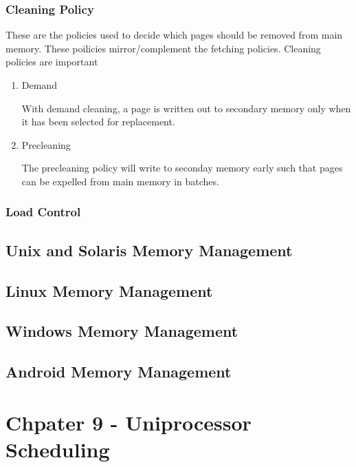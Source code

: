 \documentclass[11pt]{article}
\begin{document}
\subsubsection{Cleaning Policy}
\label{sec-2-2-5}

These are the policies used to decide which pages should be removed
from main memory. These poilicies mirror/complement the fetching
policies. Cleaning policies are important

\begin{enumerate}
\item Demand
\label{sec-2-2-5-1}

With demand cleaning, a page is written out to secondary memory
only when it has been selected for replacement.

\item Precleaning
\label{sec-2-2-5-2}

The precleaning policy will write to seconday memory early such
that pages can be expelled from main memory in batches.
\end{enumerate}

\subsubsection{Load Control}
\label{sec-2-2-6}

\subsection{Unix and Solaris Memory Management}
\label{sec-2-3}

\subsection{Linux Memory Management}
\label{sec-2-4}

\subsection{Windows Memory Management}
\label{sec-2-5}

\subsection{Android Memory Management}
\label{sec-2-6}

\section{Chpater 9 - Uniprocessor Scheduling}
\label{sec-3}
\end{document}
